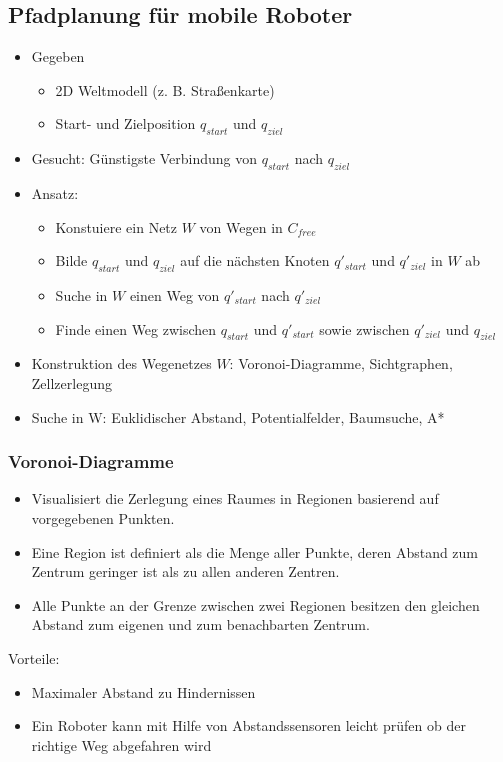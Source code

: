 \documentclass[paper=a4, fontsize=11pt]{scrartcl} %
\numberwithin{equation}{section} %
\numberwithin{figure}{section} %
\numberwithin{table}{section} %
\begin{document}
\subsection{Pfadplanung für mobile Roboter}

\begin{itemize}
\item Gegeben
\begin{itemize}
\item 2D Weltmodell (z. B. Straßenkarte)
\item Start- und Zielposition $q_{start}$ und $q_{ziel}$
\end{itemize}
\item Gesucht: Günstigste Verbindung von $q_{start}$ nach $q_{ziel}$
\item Ansatz:
\begin{itemize}
\item Konstuiere ein Netz $W$ von Wegen in $C_{free}$
\item Bilde $q_{start}$ und $q_{ziel}$ auf die nächsten Knoten $q'_{start}$ und $q'_{ziel}$ in $W$ ab
\item Suche in $W$ einen Weg von $q'_{start}$ nach $q'_{ziel}$
\item Finde einen Weg zwischen $q_{start}$ und $q'_{start}$ sowie zwischen $q'_{ziel}$ und $q_{ziel}$
\end{itemize}
\item Konstruktion des Wegenetzes $W$: Voronoi-Diagramme, Sichtgraphen, Zellzerlegung
\item Suche in W: Euklidischer Abstand, Potentialfelder, Baumsuche, A*
\end{itemize}

\subsubsection{Voronoi-Diagramme}

\begin{itemize}
\item Visualisiert die Zerlegung eines Raumes in Regionen basierend auf vorgegebenen Punkten.
\item Eine Region ist definiert als die Menge aller Punkte, deren Abstand zum Zentrum geringer ist als zu allen anderen Zentren.
\item Alle Punkte an der Grenze zwischen zwei Regionen besitzen den gleichen Abstand zum eigenen und zum benachbarten Zentrum.
\end{itemize}

Vorteile:
\begin{itemize}
\item Maximaler Abstand zu Hindernissen
\item Ein Roboter kann mit Hilfe von Abstandssensoren leicht prüfen ob der richtige Weg abgefahren wird
\end{itemize}
\end{document}
